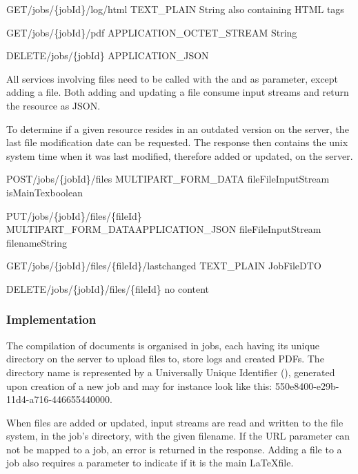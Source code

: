 {GET}{/jobs/\{jobId\}/log/html}
{}{TEXT\_PLAIN}
{String also containing HTML tags}

{GET}{/jobs/\{jobId\}/pdf}
{}{APPLICATION\_OCTET\_STREAM}
{String}

{DELETE}{/jobs/\{jobId\}}
{}{APPLICATION\_JSON}
{}


All services involving files need to be called with the  and  as parameter, except adding a file. Both adding and updating a file consume input streams and return the resource as JSON.

To determine if a given resource resides in an outdated version on the server, the last file modification date can be requested. The response then contains the unix system time when it was last modified, therefore added or updated, on the server.

{POST}{/jobs/\{jobId\}/files}
{MULTIPART\_FORM\_DATA}{}
{file}{FileInputStream}
{isMainTex}{boolean}

{PUT}{/jobs/\{jobId\}/files/\{fileId\}}
{MULTIPART\_FORM\_DATA}{APPLICATION\_JSON}
{file}{FileInputStream}
{filename}{String}

{GET}{/jobs/\{jobId\}/files/\{fileId\}/lastchanged}
{}{TEXT\_PLAIN}
{JobFileDTO}

{DELETE}{/jobs/\{jobId\}/files/\{fileId\}}
{}{}
{no content}

\subsubsection{Implementation}
\label{subsubsec:compilatex-implementation}
The compilation of documents is organised in jobs, each having its unique directory on the server to upload files to, store logs and created PDFs. The directory name is represented by a Universally Unique Identifier (), generated upon creation of a new job and may for instance look like this: 550e8400-e29b-11d4-a716-446655440000.

When files are added or updated, input streams are read and written to the file system, in the job's directory, with the given filename. If the  URL parameter can not be mapped to a job, an error is returned in the response. Adding a file to a job also requires a parameter to indicate if it is the main \LaTeX file.

